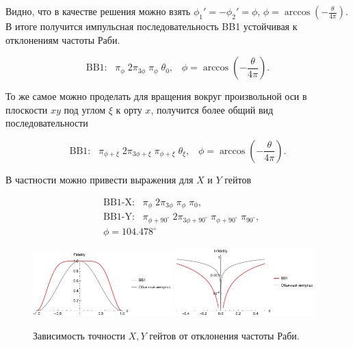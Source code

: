 Видно, что в качестве решения можно взять $\phi_1' = -\phi_2' = \phi$, $\phi = \arccos\left( -\frac{\theta}{4\pi}\right)$. В итоге получится импульсная последовательность BB1 \cite{Wimperis1994BroadbandNA, WIMPERIS199046,WIMPERIS1989509} устойчивая к отклонениям частоты Раби.

\begin{equation}
	\text{BB1:} \;\;\;  \pi_\phi \; 2\pi_{3\phi} \; \pi_\phi \; \theta_0, \;\;\; \phi = \arccos\left( -\frac{\theta}{4\pi}\right).
\end{equation}

То же самое можно проделать для вращения вокруг произвольной оси в плоскости $xy$ под углом $\xi$ к орту $x$, получится более общий вид последовательности

\begin{equation}
	\text{BB1:} \;\;\;  \pi_{\phi+\xi} \; 2\pi_{3\phi+\xi} \; \pi_{\phi+\xi} \; \theta_\xi, \;\;\; \phi = \arccos\left( -\frac{\theta}{4\pi}\right).
\end{equation}

В частности можно привести выражения для $X$ и $Y$ гейтов

\begin{equation}
	\begin{aligned}
		& \text{BB1-X:} \;\;\;  \pi_{\phi} \; 2\pi_{3\phi} \; \pi_\phi \; \pi_0,  \\
		& \text{BB1-Y:} \;\;\;  \pi_{\phi+90^{\circ}} \; 2\pi_{3\phi + 90^\circ} \; \pi_{\phi+ 90^\circ} \; \pi_{90^\circ}, \\ 
		& \phi = 104.478 ^\circ
	\end{aligned}
\end{equation}


\begin{figure}[tb]
	\centering
	\includegraphics[width=0.48\textwidth]{images/fidelity_BB1.pdf}
	\includegraphics[width=0.48\textwidth]{images/infidelity_BB1.pdf}
	\caption{Зависимость точности $X,Y$ гейтов от отклонения частоты Раби.}
	\label{fig:BB1}
\end{figure}

